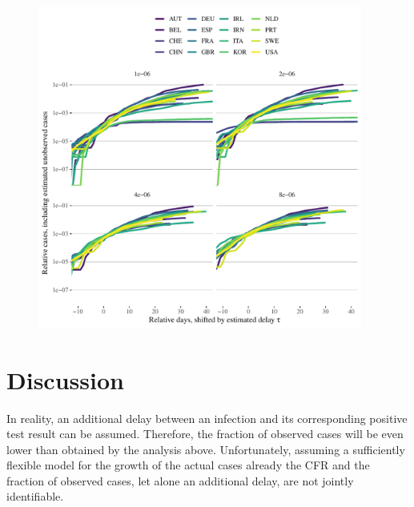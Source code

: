 \documentclass[fullpage,a4paper]{article}
\begin{document}
\begin{figure}
  \includegraphics[width=0.95\textwidth]{../figs/ecdc_aligned_case_est.pdf}
  \caption{\label{fig:aligned_case_est}}
\end{figure}

\section{Discussion}

In reality, an additional delay between an infection and its
corresponding positive test result can be assumed. Therefore, the
fraction of observed cases will be even lower than obtained by the
analysis above. Unfortunately, assuming a sufficiently flexible model
for the growth of the actual cases already the CFR and the fraction of
observed cases, let alone an additional delay, are not jointly
identifiable.
\end{document}
